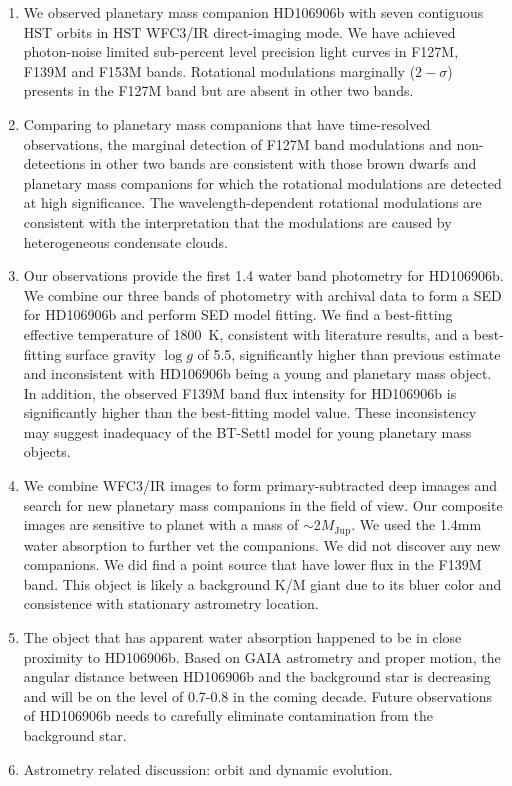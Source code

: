 \documentclass[twocolumn]{aastex62}
\newcommand{\mjup}{\ensuremath{M_\mathrm{Jup}}\xspace}
\begin{document}
\begin{enumerate}
\item We observed planetary mass companion HD106906b with seven contiguous HST orbits in HST WFC3/IR direct-imaging mode. We have achieved photon-noise limited sub-percent level precision light curves in F127M, F139M and F153M bands. Rotational modulations marginally ($2-\sigma$) presents in the F127M band but are absent in other two bands.

\item Comparing to planetary mass companions that have time-resolved observations, the marginal detection of  F127M band modulations and non-detections in other two bands are consistent with those brown dwarfs and planetary mass companions for which the rotational modulations are detected at high significance. The wavelength-dependent rotational modulations are consistent with the interpretation that the modulations are caused by heterogeneous condensate clouds.

\item Our observations provide the first 1.4 \micron water band photometry for HD106906b. We combine our three bands of photometry with archival data to form a SED for HD106906b and perform SED model fitting. We find a best-fitting effective temperature of 1800~K, consistent with literature results, and a best-fitting surface gravity $\log g$ of 5.5,  significantly higher than previous estimate and inconsistent with HD106906b being a young and planetary mass object. In addition, the observed F139M band flux intensity for HD106906b is significantly higher than the best-fitting model value. These inconsistency may suggest inadequacy of the BT-Settl model for young planetary mass objects.

\item We combine WFC3/IR images to form primary-subtracted deep imaages and search for new planetary mass companions in the field of view. Our composite images are sensitive to planet with a mass of $\sim 2 \mjup$. We used the 1.4mm water absorption to further vet the companions. We did not discover  any new companions. We did find a point source that have lower flux in the F139M band. This object is likely a background K/M giant due to its bluer color and consistence with stationary astrometry location.

\item The object that has apparent water absorption happened to be in close proximity to HD106906b. Based on GAIA astrometry and proper motion, the angular distance between HD106906b and the background star is decreasing and will be on the level of 0\arcsec.7-0\arcsec.8  in the coming decade. Future observations of HD106906b needs to carefully eliminate contamination from the background star.

\item Astrometry related discussion:  orbit and dynamic evolution.
\end{enumerate}


\end{document}
